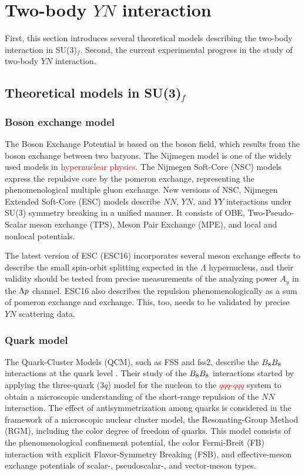 \clearpage
\section{Two-body $YN$ interaction} 
\label{sec-YNint}

First, this section introduces several theoretical models describing the two-body interaction in SU(3)$_f$. Second, the current experimental progress in the study of two-body $YN$ interaction.
\subsection{Theoretical models in SU(3)$_f$}
\subsubsection{Boson exchange model}
The Boson Exchange Potential is based on the boson field, which results from the boson exchange between two baryons. The Nijmegen model is one of the widely used models in \textcolor{red}{hypernuclear physics}. The Nijmegen Soft-Core (NSC) models express the repulsive core by the pomeron exchange, representing the phenomenological multiple gluon exchange. New versions of NSC, Nijmegen Extended Soft-Core (ESC) models describe $NN$, $YN$, and $YY$ interactions under SU(3) symmetry breaking in a unified manner. It consists of OBE, Two-Pseudo-Scalar meson exchange (TPS), Meson Pair Exchange (MPE), and local and nonlocal potentials.

The latest version of ESC (ESC16) \cite{ESC16} incorporates several meson exchange effects to describe the small spin-orbit splitting expected in the $\Lambda$ hypernucleus, and their validity should be tested from precise measurements of the analyzing power $A_y$ in the $\Lambda p$ channel. ESC16 also describes the repulsion phenomenologically as a sum of  pomeron exchange and  exchange. This, too, needs to be validated by precise $YN$ scattering data.

\subsubsection{Quark model}
The Quark-Cluster Models (QCM), such as FSS and fss2, describe the $B_{8}B_{8}$ interactions at the quark level \cite{Fujiwara-2007}. Their study of the $B_{8}B_{8}$ interactions started by applying the three-quark ($3q$) model for the nucleon to the \textcolor{red}{$qqq$-$qqq$} system to obtain a microscopic understanding of the short-range repulsion of the $NN$ interaction. The effect of antisymmetrization among quarks is considered in the framework of a microscopic nuclear cluster model, the Resonating-Group Method (RGM), including the color degree of freedom of quarks. This model consists of the phenomenological confinement potential, the color Fermi-Breit (FB) interaction with explicit Flavor-Symmetry Breaking (FSB), and effective-meson exchange potentials of scalar-, pseudoscalar-, and vector-meson types. 

